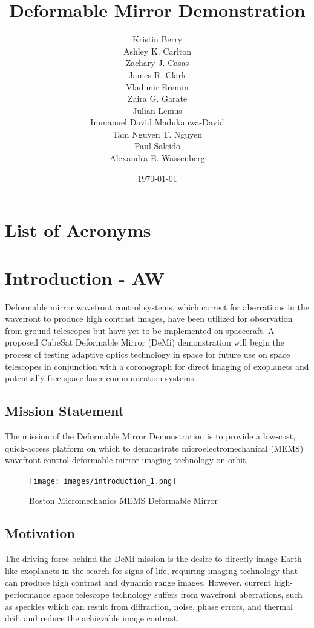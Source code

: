 \documentclass[12pt]{article}
\title{Deformable Mirror Demonstration}
\author{Kristin Berry\\
Ashley K. Carlton\\
Zachary J. Casas\\
James R. Clark\\
Vladimir Eremin\\ 
Zaira G. Garate\\ 
Julian Lemus\\
Immanuel David Madukauwa-David\\
Tam Nguyen T. Nguyen\\
Paul Salcido\\
Alexandra E. Wassenberg 
}
\date{\today}
\begin{document}
\maketitle
\newpage

\tableofcontents
\listoffigures
\listoftables


\section*{List of Acronyms}
\begin{acronym}


\end{acronym}
\newpage

\section{Introduction - AW}
Deformable mirror wavefront control systems, which correct for aberrations in the wavefront to produce high contrast images, have been utilized for observation from ground telescopes but have yet to be implemented on spacecraft.  A proposed CubeSat Deformable Mirror (DeMi) demonstration will begin the process of testing adaptive optics technology in space for future use on space telescopes in conjunction with a coronograph for direct imaging of exoplanets and potentially free-space laser communication systems.

		\subsection{Mission Statement}
		The mission of the Deformable Mirror Demonstration is to provide a low-cost, quick-access platform on which to demonstrate microelectromechanical (MEMS) wavefront control deformable mirror imaging technology on-orbit.

		\begin{figure}[!ht]
				\centering
				\texttt{[image: images/introduction\_1.png]}
				\caption{Boston Micromechanics MEMS Deformable Mirror}
				\label{fig:Intro_demi}
			\end{figure}
	
		\subsection{Motivation}
		The driving force behind the DeMi mission is the desire to directly image Earth-like exoplanets in the search for signs of life, requiring imaging technology that can produce high contrast and dynamic range images.  However, current high-performance space telescope technology suffers from wavefront aberrations, such as speckles which can result from diffraction, noise, phase errors, and thermal drift and reduce the achievable image contrast.   
\end{document}
